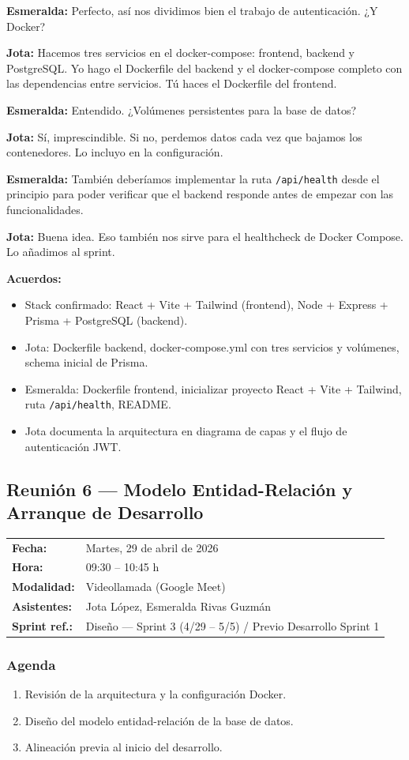 \documentclass[12pt, a4paper]{article}
\makeatletter
\newcommand{\actaheader}[5]{%
  \begin{mdframed}[
    backgroundcolor=sectionbg,
    linecolor=bordercolor,
    linewidth=1pt,
    innerleftmargin=12pt, innerrightmargin=12pt,
    innertopmargin=10pt, innerbottommargin=10pt,
    skipabove=8pt, skipbelow=8pt
  ]
  \begin{tabularx}{\linewidth}{@{}lX@{}}
    \textbf{Fecha:}       & #1 \\[2pt]
    \textbf{Hora:}        & #2 \\[2pt]
    \textbf{Modalidad:}   & #3 \\[2pt]
    \textbf{Asistentes:}  & #4 \\[2pt]
    \textbf{Sprint ref.:} & #5 \\
  \end{tabularx}
  \end{mdframed}%
}
\newcommand{\jota}[1]{\noindent\textbf{\color{primary}Jota:} #1\par\smallskip}
\newcommand{\esme}[1]{\noindent\textbf{\color{accentgreen}Esmeralda:} #1\par\smallskip}
\makeatother
\begin{document}
\esme{Perfecto, así nos dividimos bien el trabajo de autenticación. ¿Y Docker?}

\jota{Hacemos tres servicios en el docker-compose: frontend, backend y PostgreSQL. Yo hago el Dockerfile del backend y el docker-compose completo con las dependencias entre servicios. Tú haces el Dockerfile del frontend.}

\esme{Entendido. ¿Volúmenes persistentes para la base de datos?}

\jota{Sí, imprescindible. Si no, perdemos datos cada vez que bajamos los contenedores. Lo incluyo en la configuración.}

\esme{También deberíamos implementar la ruta \texttt{/api/health} desde el principio para poder verificar que el backend responde antes de empezar con las funcionalidades.}

\jota{Buena idea. Eso también nos sirve para el healthcheck de Docker Compose. Lo añadimos al sprint.}

\begin{acuerdobox}
\textbf{Acuerdos:}
\begin{itemize}[leftmargin=1.2em, topsep=2pt]
  \item Stack confirmado: React + Vite + Tailwind (frontend), Node + Express + Prisma + PostgreSQL (backend).
  \item Jota: Dockerfile backend, docker-compose.yml con tres servicios y volúmenes, schema inicial de Prisma.
  \item Esmeralda: Dockerfile frontend, inicializar proyecto React + Vite + Tailwind, ruta \texttt{/api/health}, README.
  \item Jota documenta la arquitectura en diagrama de capas y el flujo de autenticación JWT.
\end{itemize}
\end{acuerdobox}

\subsection{Reunión 6 — Modelo Entidad-Relación y Arranque de Desarrollo}
\actaheader
  {Martes, 29 de abril de 2026}
  {09:30 -- 10:45 h}
  {Videollamada (Google Meet)}
  {Jota López, Esmeralda Rivas Guzmán}
  {Diseño — Sprint 3 (4/29 -- 5/5) / Previo Desarrollo Sprint 1}

\subsubsection*{Agenda}
\begin{enumerate}[leftmargin=1.5em]
  \item Revisión de la arquitectura y la configuración Docker.
  \item Diseño del modelo entidad-relación de la base de datos.
  \item Alineación previa al inicio del desarrollo.
\end{enumerate}
\end{document}
